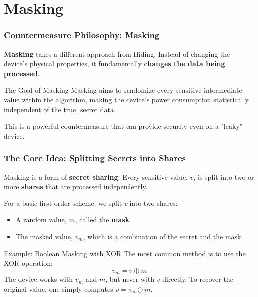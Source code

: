 \section{Masking} 

\begin{frame}
    \frametitle{Countermeasure Philosophy: Masking}
    
    \textbf{Masking} takes a different approach from Hiding. Instead of changing the device's physical properties, it fundamentally \textbf{changes the data being processed}.
    
    \begin{alertblock}{The Goal of Masking}
        Masking aims to randomize every sensitive intermediate value within the algorithm, making the device's power consumption statistically independent of the true, secret data.
    \end{alertblock}
    
    This is a powerful countermeasure that can provide security even on a "leaky" device.
    
\end{frame}

\begin{frame}
    \frametitle{The Core Idea: Splitting Secrets into Shares}

    Masking is a form of \textbf{secret sharing}. Every sensitive value, $v$, is split into two or more \textbf{shares} that are processed independently.
    
    For a basic first-order scheme, we split $v$ into two shares:
    
    \begin{itemize}
        \item A random value, $m$, called the \textbf{mask}.
        \item The masked value, $v_m$, which is a combination of the secret and the mask.
    \end{itemize}

    \begin{block}{Example: Boolean Masking with XOR}
        The most common method is to use the XOR operation:
        \[ v_m = v \oplus m \]
        The device works with $v_m$ and $m$, but never with $v$ directly. To recover the original value, one simply computes $v = v_m \oplus m$.
    \end{block}
\end{frame}

